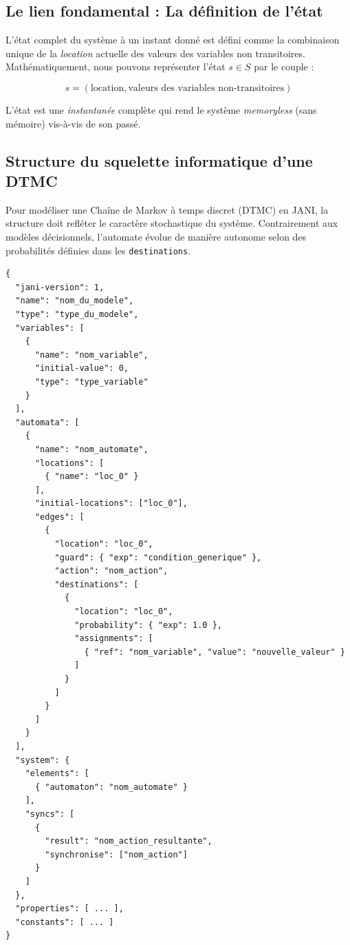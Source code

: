 \documentclass[14pt, a4paper]{extarticle}
\begin{document}
\subsection*{Le lien fondamental : La définition de l'état}

L'état complet du système à un instant donné est défini comme la combinaison unique de la \textit{location} actuelle des valeurs des variables non transitoires. Mathématiquement, nous pouvons représenter l'état \(s \in S\) par le couple :

$$ s = (\text{location}, \text{valeurs des variables non-transitoires}) $$

L'état est une \textit{instantanée} complète qui rend le système \textit{memoryless} (sans mémoire) vis-à-vis de son passé.
\subsection{Structure du squelette informatique d'une DTMC}

Pour modéliser une Chaîne de Markov à temps discret (DTMC) en JANI, la structure doit refléter le caractère stochastique du système. Contrairement aux modèles décisionnels, l'automate évolue de manière autonome selon des probabilités définies dans les \texttt{destinations}.

\begin{lstlisting}[caption={Structure JANI complète pour une DTMC (générique)}]
{
  "jani-version": 1,
  "name": "nom_du_modele",
  "type": "type_du_modele",
  "variables": [
    {
      "name": "nom_variable",
      "initial-value": 0,
      "type": "type_variable"
    }
  ],
  "automata": [
    {
      "name": "nom_automate",
      "locations": [
        { "name": "loc_0" }
      ],
      "initial-locations": ["loc_0"],
      "edges": [
        {
          "location": "loc_0",
          "guard": { "exp": "condition_generique" },
          "action": "nom_action",
          "destinations": [
            {
              "location": "loc_0",
              "probability": { "exp": 1.0 },
              "assignments": [
                { "ref": "nom_variable", "value": "nouvelle_valeur" }
              ]
            }
          ]
        }
      ]
    }
  ],
  "system": {
    "elements": [
      { "automaton": "nom_automate" }
    ],
    "syncs": [
      {
        "result": "nom_action_resultante",
        "synchronise": ["nom_action"]
      }
    ]
  },
  "properties": [ ... ],
  "constants": [ ... ]
}
\end{lstlisting}
\end{document}
